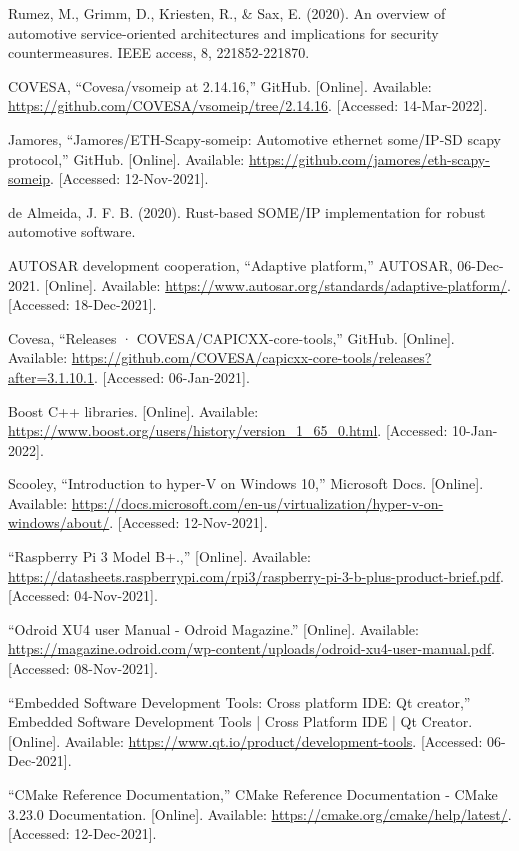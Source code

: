 \documentclass[a4paper, 12pt, oneside, BCOR1cm,toc=chapterentrywithdots]{scrbook}
\begin{document}
\begin{thebibliography}{00}
Rumez, M., Grimm, D., Kriesten, R., \& Sax, E. (2020). An overview of automotive service-oriented architectures and implications for security countermeasures. IEEE access, 8, 221852-221870.

COVESA, “Covesa/vsomeip at 2.14.16,” GitHub. [Online]. Available: \url{https://github.com/COVESA/vsomeip/tree/2.14.16}. [Accessed: 14-Mar-2022]. 

Jamores, “Jamores/ETH-Scapy-someip: Automotive ethernet some/IP-SD scapy protocol,” GitHub. [Online]. Available: \url{https://github.com/jamores/eth-scapy-someip}. [Accessed: 12-Nov-2021]. 

de Almeida, J. F. B. (2020). Rust-based SOME/IP implementation for robust automotive software.

AUTOSAR development cooperation, “Adaptive platform,” AUTOSAR, 06-Dec-2021. [Online]. Available: \url{https://www.autosar.org/standards/adaptive-platform/}. [Accessed: 18-Dec-2021]. 

Covesa, “Releases · COVESA/CAPICXX-core-tools,” GitHub. [Online]. Available: \url{https://github.com/COVESA/capicxx-core-tools/releases?after=3.1.10.1}. [Accessed: 06-Jan-2021].

Boost C++ libraries. [Online]. Available: \url{https://www.boost.org/users/history/version_1_65_0.html}. [Accessed: 10-Jan-2022].  

Scooley, “Introduction to hyper-V on Windows 10,” Microsoft Docs. [Online]. Available: \url{https://docs.microsoft.com/en-us/virtualization/hyper-v-on-windows/about/}. [Accessed: 12-Nov-2021]. 

“Raspberry Pi 3 Model B+.,”  [Online]. Available: \url{https://datasheets.raspberrypi.com/rpi3/raspberry-pi-3-b-plus-product-brief.pdf}. [Accessed: 04-Nov-2021]. 

“Odroid XU4 user Manual - Odroid Magazine.” [Online]. Available: \url{https://magazine.odroid.com/wp-content/uploads/odroid-xu4-user-manual.pdf}. [Accessed: 08-Nov-2021]. 

“Embedded Software Development Tools: Cross platform IDE: Qt creator,” Embedded Software Development Tools | Cross Platform IDE | Qt Creator. [Online]. Available: \url{https://www.qt.io/product/development-tools}. [Accessed: 06-Dec-2021]. 

“CMake Reference Documentation,” CMake Reference Documentation - CMake 3.23.0 Documentation. [Online]. Available: \url{https://cmake.org/cmake/help/latest/}. [Accessed: 12-Dec-2021]. 


\end{thebibliography}
\end{document}
